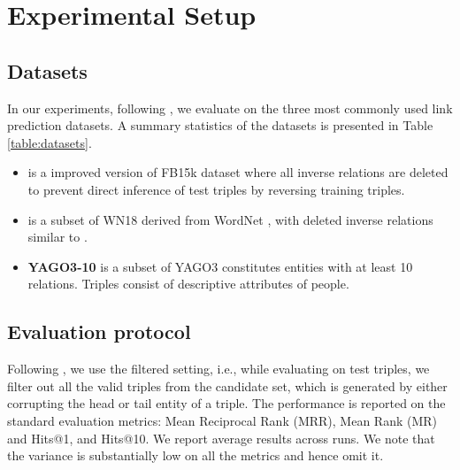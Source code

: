 \documentclass[11pt,a4paper]{article}
\begin{document}
\section{Experimental Setup}
\label{sec:experiments}

\subsection{Datasets}
\label{sec:datasets}
In our experiments, following \citet{conve,rotate}, we evaluate on the three most commonly used link prediction datasets. A summary statistics of the datasets is presented in Table \ref{table:datasets}.
\begin{itemize}[itemsep=2pt,parsep=0pt,partopsep=0pt,leftmargin=10pt,topsep=2pt]
\item \textbf{\datafbn{}} \cite{toutanova} is a improved version of FB15k \cite{transe} dataset where all inverse relations are deleted to prevent direct inference of test triples by reversing training triples.
	\item \textbf{\datawnn{}} \cite{conve} is a subset of WN18 \cite{transe} derived from WordNet \cite{wordnet}, with deleted inverse relations similar to \datafbn{}.
	\item \textbf{YAGO3-10} is a subset of YAGO3 \cite{yago} constitutes entities with at least 10 relations. Triples consist of descriptive attributes of people.
\end{itemize}


\subsection{Evaluation protocol}
\label{sec:evaluation}
Following \cite{transe}, we use the filtered setting, i.e., while evaluating on test triples, we filter out all the valid triples from the candidate set, which is generated by either corrupting the head or tail entity of a triple. The performance is reported on the standard evaluation metrics: Mean Reciprocal Rank (MRR), Mean Rank (MR) and Hits@1, and Hits@10. We report average results across  runs. We note that the variance is substantially low on all the metrics and hence omit it. 
\end{document}
